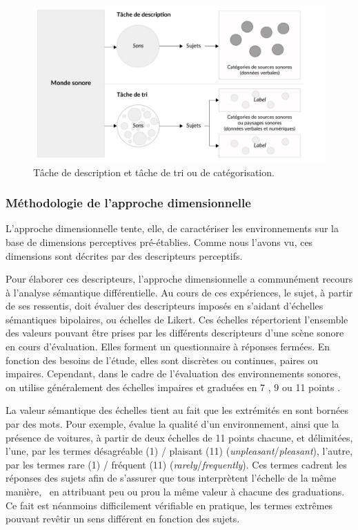 \begin{figure}[t]
        \myfloatalign
        \includegraphics[width=.8\linewidth]{gfx/ch_3/desCat}
        \caption{Tâche de description et tâche de tri ou de catégorisation.}\label{fig:descat}
\end{figure}


\subsubsection{Méthodologie de l'approche dimensionnelle}
\label{sec:ch3_appDimensionelle}

L'approche dimensionnelle tente, elle, de caractériser les environnements sur la base de dimensions perceptives pré-établies. Comme nous l'avons vu, ces dimensions sont décrites par des descripteurs perceptifs.

Pour élaborer ces descripteurs, l'approche dimensionnelle a communément recours à l'analyse sémantique différentielle. Au cours de ces expériences, le sujet, à partir de ses ressentis, doit évaluer des descripteurs imposés en s'aidant d'échelles sémantiques bipolaires, ou échelles de Likert. Ces échelles répertorient l'ensemble des valeurs pouvant être prises par les différents descripteurs d'une scène sonore en cours d'évaluation. Elles forment un questionnaire à réponses fermées. En fonction des besoins de l'étude, elles sont discrètes ou continues, paires ou impaires. Cependant, dans le cadre de l'évaluation des environnements sonores, on utilise généralement des échelles impaires et graduées en 7 \citep{raimbault2006qualitative}, 9 \citep{hall2013exploratory} ou 11 points \citep{ricciardi2015sound}.

La valeur sémantique des échelles tient au fait que les extrémités en sont bornées par des mots. Pour exemple, \citep{ricciardi2015sound} évalue la qualité d'un environnement, ainsi que la présence de voitures, à partir de deux échelles de 11 points chacune, et délimitées, l'une, par les termes désagréable (1) / plaisant (11) (\emph{unpleasant}/\emph{pleasant}), l'autre, par les termes rare (1) / fréquent (11) (\emph{rarely}/\emph{frequently}). Ces termes cadrent les réponses des sujets afin de s'assurer que tous interprètent l'échelle de la même manière, \ie~en attribuant peu ou prou la même valeur à chacune des graduations. Ce fait est néanmoins difficilement vérifiable en pratique, les termes extrêmes pouvant revêtir un sens différent en fonction des sujets.

